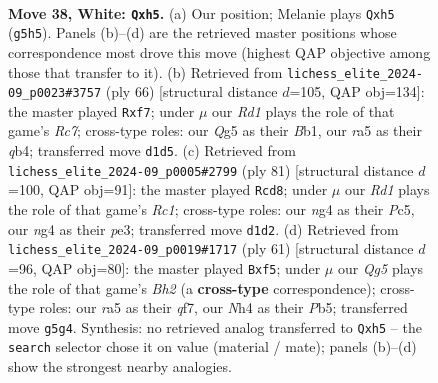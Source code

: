 \documentclass[11pt]{article}
\begin{document}
\clearpage

\begin{figure}[p]\centering
\begin{subfigure}{0.46\textwidth}\centering
\resizebox{\linewidth}{!}{%
\newchessgame
\chessboard[
  setfen={2r3k1/3n2p1/1p6/r2p2Qp/P3p1nN/2q5/2P2P1P/R2R1K2 w - - 0 38},
  showmover=false,
  pgfstyle=straightmove, color=movearrow, markmove={g5-h5}
]}
\caption{}
\end{subfigure}\hfill
\begin{subfigure}{0.46\textwidth}\centering
\resizebox{\linewidth}{!}{%
\newchessgame
\chessboard[
  setfen={3r1rk1/2R2p2/5Qpp/p4b2/1q1Pp3/1P5P/5PP1/1BR3K1 w - - 3 34},
  showmover=false,
  pgfstyle=straightmove, color=movearrow, markmove={c7-f7}
]}
\caption{}
\end{subfigure}
\\[4pt]
\begin{subfigure}{0.46\textwidth}\centering
\resizebox{\linewidth}{!}{%
\newchessgame
\chessboard[
  setfen={k1r4r/1p6/p7/2pQ4/1P3P2/P2PP1R1/4qPKp/7R b - - 2 41},
  showmover=false,
  pgfstyle=straightmove, color=movearrow, markmove={c8-d8}
]}
\caption{}
\end{subfigure}\hfill
\begin{subfigure}{0.46\textwidth}\centering
\resizebox{\linewidth}{!}{%
\newchessgame
\chessboard[
  setfen={r3r2k/5Qpb/4P2p/1pp2N2/2q5/p1P4P/5PP1/2R1R1K1 b - - 3 31},
  showmover=false,
  pgfstyle=straightmove, color=movearrow, markmove={h7-f5}
]}
\caption{}
\end{subfigure}
\caption{\textbf{Move 38, White: \texttt{Qxh5}.} (a) Our position; Melanie plays \texttt{Qxh5} (\texttt{g5h5}). Panels (b)--(d) are the retrieved master positions whose correspondence most drove this move (highest QAP objective among those that transfer to it). (b) Retrieved from \texttt{lichess\_elite\_2024-09\_p0023\#3757} (ply 66) [structural distance $d$=105, QAP obj=134]: the master played \texttt{Rxf7}; under $\mu$ our \emph{Rd1} plays the role of that game's \emph{Rc7}; cross-type roles: our \emph{Q}g5 as their \emph{B}b1, our \emph{r}a5 as their \emph{q}b4; transferred move \texttt{d1d5}. (c) Retrieved from \texttt{lichess\_elite\_2024-09\_p0005\#2799} (ply 81) [structural distance $d$=100, QAP obj=91]: the master played \texttt{Rcd8}; under $\mu$ our \emph{Rd1} plays the role of that game's \emph{Rc1}; cross-type roles: our \emph{n}g4 as their \emph{P}c5, our \emph{n}g4 as their \emph{p}e3; transferred move \texttt{d1d2}. (d) Retrieved from \texttt{lichess\_elite\_2024-09\_p0019\#1717} (ply 61) [structural distance $d$=96, QAP obj=80]: the master played \texttt{Bxf5}; under $\mu$ our \emph{Qg5} plays the role of that game's \emph{Bh2} (a \textbf{cross-type} correspondence); cross-type roles: our \emph{r}a5 as their \emph{q}f7, our \emph{N}h4 as their \emph{P}b5; transferred move \texttt{g5g4}. Synthesis: no retrieved analog transferred to \texttt{Qxh5} -- the \texttt{search} selector chose it on value (material / mate); panels (b)--(d) show the strongest nearby analogies.}
\label{fig:thought-m74}
\end{figure}
\end{document}
